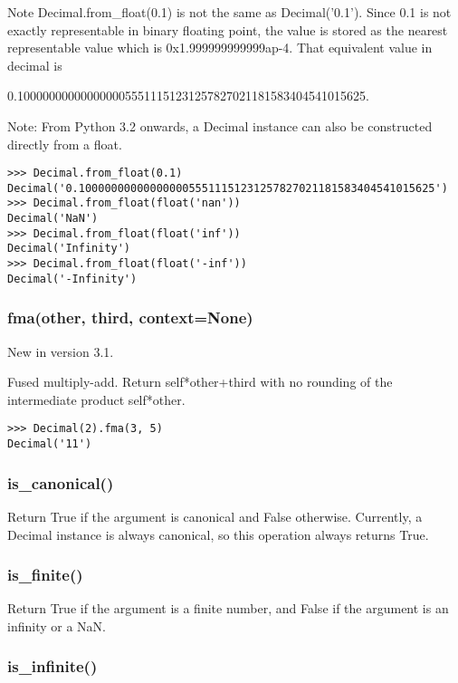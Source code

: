 Note Decimal.from\_float(0.1) is not the same as Decimal('0.1'). Since 0.1 is not exactly representable in binary floating point, the value is stored as the nearest representable value which is 0x1.999999999999ap-4. That equivalent value in decimal is

0.1000000000000000055511151231257827021181583404541015625.

\vpara
Note:
From Python 3.2 onwards, a Decimal instance can also be constructed directly from a float.


\begin{lstlisting}
>>> Decimal.from_float(0.1)
Decimal('0.1000000000000000055511151231257827021181583404541015625')
>>> Decimal.from_float(float('nan'))
Decimal('NaN')
>>> Decimal.from_float(float('inf'))
Decimal('Infinity')
>>> Decimal.from_float(float('-inf'))
Decimal('-Infinity')
\end{lstlisting}


\subsubsection{fma(other, third, context=None)}

New in version 3.1. 

Fused multiply-add. Return self*other+third with no rounding of the intermediate product self*other.

\begin{lstlisting}
>>> Decimal(2).fma(3, 5)
Decimal('11')
\end{lstlisting}

\subsubsection{is\_canonical()}

Return True if the argument is canonical and False otherwise. Currently, a Decimal instance is always canonical, so this operation always returns True.

\subsubsection{is\_finite()}

Return True if the argument is a finite number, and False if the argument is an infinity or a NaN.

\subsubsection{is\_infinite()}

